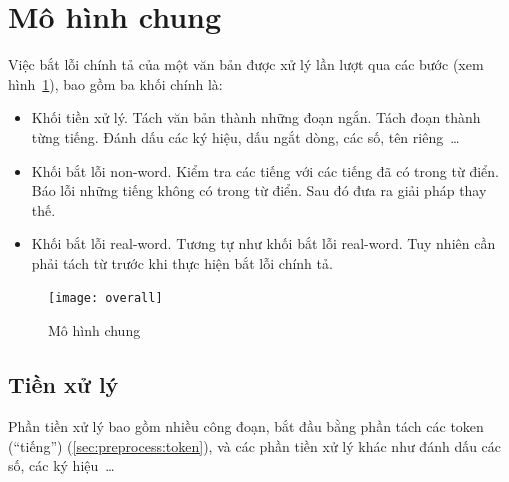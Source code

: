 \documentclass[a4paper,oneside,14pt]{extbook} %
\begin{document}
\section{Mô hình chung}

Việc bắt lỗi chính tả của một văn bản được xử lý lần lượt qua các bước
(xem hình~\ref{fig:overall-model}), bao gồm ba khối chính là:
\begin{itemize}
\item Khối tiền xử lý.
  Tách văn bản thành những đoạn ngắn. Tách
  đoạn thành từng tiếng. Đánh dấu các ký hiệu, dấu ngắt dòng, các số,
  tên riêng~\ldots{}

\item Khối bắt lỗi non-word.
   Kiểm tra các tiếng với các tiếng đã có
   trong từ điển. Báo lỗi những tiếng không có trong từ điển. Sau đó 
   đưa ra giải pháp thay thế.

\item Khối bắt lỗi real-word.
  Tương tự như khối bắt lỗi real-word. Tuy nhiên cần phải tách từ
  trước khi thực hiện bắt lỗi chính tả.
\end{itemize}


\begin{figure}[htbp]
  \centering
  \texttt{[image: overall]}
  \caption{Mô hình chung}
  \label{fig:overall-model}
\end{figure}


\subsection{Tiền xử lý}

Phần tiền xử lý bao gồm nhiều công đoạn, bắt đầu bằng phần tách các
token (``tiếng'') (\ref{sec:preprocess:token}), và các phần tiền xử lý
khác như đánh dấu các số, các ký hiệu~\ldots
\end{document}
